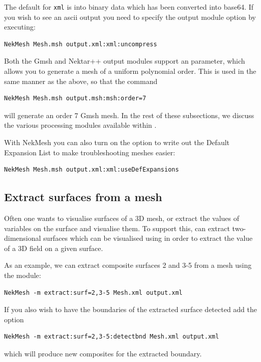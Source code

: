 The default for \texttt{xml} is into binary data which has been
converted into base64. If you wish to see an ascii output you need to
specify the output module option  by executing:
%
\begin{lstlisting}[style=BashInputStyle]
NekMesh Mesh.msh output.xml:xml:uncompress
\end{lstlisting}
%
Both the Gmsh and Nektar++ output modules support an 
parameter, which allows you to generate a mesh of a uniform polynomial
order. This is used in the same manner as the above, so that the command
%
\begin{lstlisting}[style=BashInputStyle]
NekMesh Mesh.msh output.msh:msh:order=7
\end{lstlisting}
%
will generate an order 7 Gmsh mesh. In the rest of these subsections, we discuss
the various processing modules available within \nm.

With NekMesh you can also turn on the option  to write out the Default Expansion List to make troubleshooting meshes easier:
%
\begin{lstlisting}[style=BashInputStyle]
NekMesh Mesh.msh output.xml:xml:useDefExpansions
\end{lstlisting}
%


\subsection{Extract surfaces from a mesh}
\label{s:utilities:nekmesh:extract}

Often one wants to visualise surfaces of a 3D mesh, or extract the values of
variables on the surface and visualise them. To support this, \nm can extract
two-dimensional surfaces which can be visualised using  in
order to extract the value of a 3D field on a given surface.

As an example, we can extract composite surfaces 2 and 3-5 from a mesh using the
 module:
%
\begin{lstlisting}[style=BashInputStyle]
NekMesh -m extract:surf=2,3-5 Mesh.xml output.xml
\end{lstlisting}
%
If you also wish to have the boundaries of the extracted surface detected add
the  option
%
\begin{lstlisting}[style=BashInputStyle]
NekMesh -m extract:surf=2,3-5:detectbnd Mesh.xml output.xml
\end{lstlisting}
which will produce new composites for the extracted boundary.

